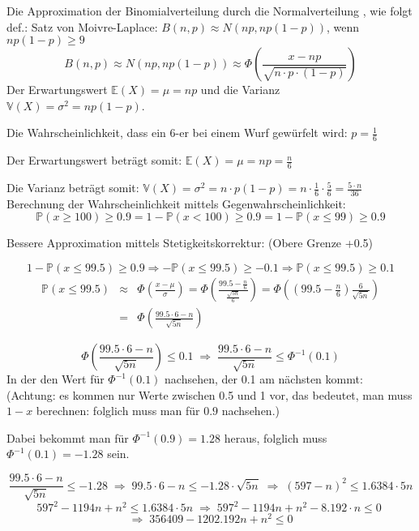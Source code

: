 \begin{uebsp}
\begin{Answer}
\begin{uebsp_theory}
    Die Approximation der Binomialverteilung durch die Normalverteilung , wie folgt def.:
    Satz von Moivre-Laplace: $B(n,p)\approx N(np,np(1-p))$, wenn $np(1-p)\geq9$
        \[B(n,p)\approx N(np,np(1-p))\approx\Phi\left(\frac{x-np}{\sqrt{n\cdot p\cdot(1-p)}}\right)\]
    Der Erwartungswert $\mathbb{E}(X)=\mu=np$ und die Varianz $\mathbb{V}(X)=\sigma^2=np(1-p)$.
\end{uebsp_theory}
Die Wahrscheinlichkeit, dass ein 6-er bei einem Wurf gewürfelt wird: $p=\frac{1}{6}$

Der Erwartungswert beträgt somit: $\mathbb{E}(X)=\mu=np=\frac{n}{6}$

Die Varianz beträgt somit: $\mathbb{V}(X)=\sigma^2=n\cdot p(1-p)=n\cdot \frac{1}{6}\cdot \frac{5}{6}=\frac{5\cdot n}{36}$\\

Berechnung der Wahrscheinlichkeit mittels Gegenwahrscheinlichkeit:
\[\mathbb{P}(x\geq 100)\geq 0.9 = 1-\mathbb{P}(x<100)\geq 0.9 = 1-\mathbb{P}(x\leq 99)\geq 0.9\]

Bessere Approximation mittels Stetigkeitskorrektur: (Obere Grenze +0.5)

\[1-\mathbb{P}(x\leq 99.5)\geq 0.9\Rightarrow -\mathbb{P}(x\leq 99.5)\geq-0.1\Rightarrow\mathbb{P}(x\leq 99.5)\geq0.1\]
\begin{eqnarray*}\mathbb{P}(x\leq 99.5)&\approx&\Phi\left(\frac{x-\mu}{\sigma}\right)=\Phi\left(\frac{99.5-\frac{n}{6}}{\frac{\sqrt{5n}}{6}}\right)=\Phi\left(\left(99.5-\frac{n}{6}\right){\frac{6}{\sqrt{5n}}}\right)\\
&=&\Phi\left(\frac{99.5\cdot 6-n}{\sqrt{5n}}\right)\end{eqnarray*}

\[\Phi\left(\frac{99.5\cdot 6-n}{\sqrt{5n}}\right)\leq 0.1\;\Rightarrow\;\frac{99.5\cdot 6-n}{\sqrt{5n}}\leq \Phi^{-1}(0.1)\]
In der  den Wert für $\Phi^{-1}(0.1)$ nachsehen, der 0.1 am nächsten kommt: (Achtung: es kommen nur Werte zwischen 0.5 und 1 vor, das bedeutet, man muss $1-x$ berechnen: folglich muss man für $0.9$ nachsehen.)

Dabei bekommt man für $\Phi^{-1}(0.9)=1.28$ heraus, folglich muss $\Phi^{-1}(0.1)=-1.28$ sein.

\[\frac{99.5\cdot 6-n}{\sqrt{5n}}\leq -1.28\;\Rightarrow\;99.5\cdot 6-n\leq -1.28\cdot \sqrt{5n}\;\Rightarrow\;(597-n)^2\leq 1.6384\cdot 5n\]
\[597^2-1194n+n^2\leq 1.6384\cdot 5n\;\Rightarrow\;597^2-1194n+n^2-8.192\cdot n\leq 0\;\]
\[\Rightarrow\;356409-1202.192n+n^2\leq 0\]


\end{Answer}
\end{uebsp}

